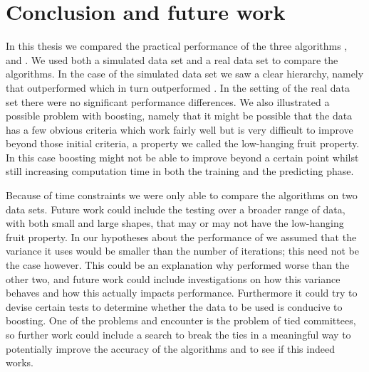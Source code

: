 
\chapter{Conclusion and future work} 
\label{sec:Concl}

In this thesis we compared the practical performance of the three algorithms \adaB, \NHB and \squintB.  We used both a simulated data set and a real data set to compare the algorithms. In the case of the simulated data set we saw a clear hierarchy, namely that \NHB outperformed \adaB which in turn outperformed \squintB. In the setting of the real data set  there were no significant performance differences.
We also illustrated a possible problem with boosting, namely that it might be possible that the data has a few obvious criteria which work fairly well but is very difficult to improve beyond those initial criteria, a property we called the low-hanging fruit property. In this case boosting might not be able to improve beyond a certain point whilst still increasing computation time in both the training and the predicting phase. 

\par Because of time constraints we were only able to compare the algorithms on two data sets. Future work could include the testing over a broader range of data, with both small and large shapes, that may or may not have the low-hanging fruit property. In our hypotheses about the performance of \squintB we assumed that the variance it uses would be smaller than the number of iterations; this need not be the case however. This could be an explanation why \squinB performed worse than the other two, and future work could include investigations on how this variance behaves and how this actually impacts performance. Furthermore it could try to devise certain tests to determine whether the data to be used is conducive to boosting. One of the problems \squintB and \NHB encounter is the problem of tied committees, so further work could include a search to break the ties in a meaningful way to potentially improve the accuracy of the algorithms and to see if this indeed works.